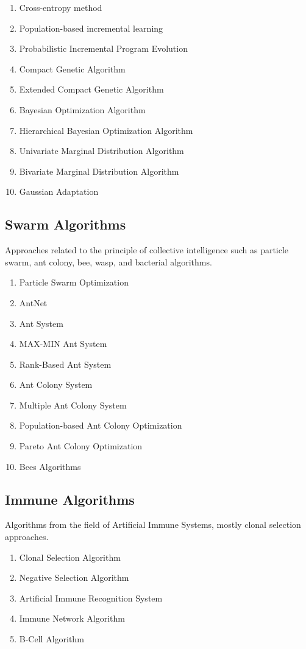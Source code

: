 \documentclass[a4paper, 11pt]{article}
\begin{document}
\begin{enumerate}
	\item Cross-entropy method
	\item Population-based incremental learning
	\item Probabilistic Incremental Program Evolution
	\item Compact Genetic Algorithm
	\item Extended Compact Genetic Algorithm
	\item Bayesian Optimization Algorithm
	\item Hierarchical Bayesian Optimization Algorithm
	\item Univariate Marginal Distribution Algorithm
	\item Bivariate Marginal Distribution Algorithm
	\item Gaussian Adaptation
\end{enumerate}

\subsection{Swarm Algorithms}
Approaches related to the principle of collective intelligence such as particle swarm, ant colony, bee, wasp, and bacterial algorithms. 

\begin{enumerate}
	\item Particle Swarm Optimization
	\item AntNet
	\item Ant System
	\item MAX-MIN Ant System
	\item Rank-Based Ant System
	\item Ant Colony System
	\item Multiple Ant Colony System
	\item Population-based Ant Colony Optimization
	\item Pareto Ant Colony Optimization
	\item Bees Algorithms
\end{enumerate}

\subsection{Immune Algorithms}
Algorithms from the field of Artificial Immune Systems, mostly clonal selection approaches.

\begin{enumerate}
	\item Clonal Selection Algorithm
	\item Negative Selection Algorithm
	\item Artificial Immune Recognition System
	\item Immune Network Algorithm
	\item B-Cell Algorithm
\end{enumerate}
\end{document}
